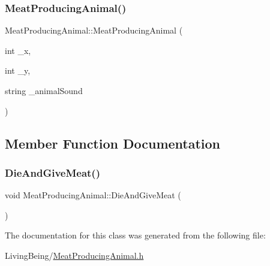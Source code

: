 \subsubsection{\texorpdfstring{MeatProducingAnimal()}{MeatProducingAnimal()}}
{\footnotesize\ttfamily Meat\+Producing\+Animal\+::\+Meat\+Producing\+Animal (\begin{DoxyParamCaption}\item[{int}]{\+\_\+x,  }\item[{int}]{\+\_\+y,  }\item[{string}]{\+\_\+animal\+Sound }\end{DoxyParamCaption})}



\subsection{Member Function Documentation}
\mbox{\label{classMeatProducingAnimal_a650fb47769f851ca11171d217bf78ef6}} 
\subsubsection{\texorpdfstring{DieAndGiveMeat()}{DieAndGiveMeat()}}
{\footnotesize\ttfamily void Meat\+Producing\+Animal\+::\+Die\+And\+Give\+Meat (\begin{DoxyParamCaption}{ }\end{DoxyParamCaption})}



The documentation for this class was generated from the following file\+:\begin{DoxyCompactItemize}
\item 
Living\+Being/\mbox{\hyperlink{MeatProducingAnimal_8h}{Meat\+Producing\+Animal.\+h}}\end{DoxyCompactItemize}
